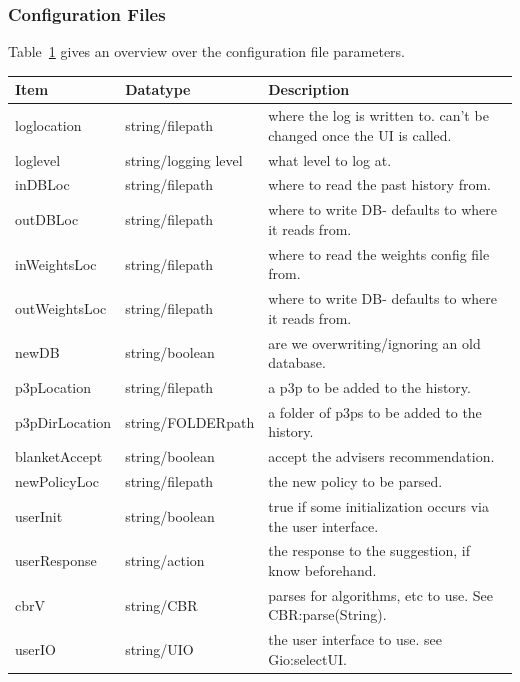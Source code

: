 \subsubsection{Configuration Files}

Table~\ref{configTable} gives an overview over the configuration file parameters.

\begin{center}
  \begin{table}[h!]
    \label{configTable}
    \begin{tabular} { | l | l | p{7cm} | }
      \hline
      \textbf{Item} & \textbf{Datatype} & \textbf{Description} \\ \hline
      loglocation & string/filepath  & where the log is written to. can't be changed once the UI is  called. \\ \hline
      loglevel & string/logging level	& what level to log at. \\ \hline
      inDBLoc & string/filepath	& where to read the past history from. \\ \hline
      outDBLoc & string/filepath & where to write DB- defaults to where it reads from. \\ \hline
      inWeightsLoc& string/filepath & where to read the weights config file from. \\ \hline
      outWeightsLoc	& string/filepath & where to write DB- defaults to where it reads from. \\ \hline
      newDB & string/boolean & are we overwriting/ignoring an old database. \\ \hline
      p3pLocation & string/filepath & a p3p to be added to the history. \\ \hline
      p3pDirLocation	& string/FOLDERpath& a folder of p3ps to be added to the history. \\ \hline
      blanketAccept & string/boolean & accept the advisers recommendation. \\ \hline
      newPolicyLoc & string/filepath	& the new policy to be parsed. \\ \hline
      userInit & string/boolean	& true if some initialization occurs via the user interface. \\ \hline
      userResponse & string/action	& the response to the suggestion, if know beforehand. \\ \hline
      cbrV & string/CBR & parses for algorithms, etc to use. See CBR:parse(String). \\ \hline
      userIO & string/UIO	& the user interface to use. see Gio:selectUI. \\ \hline

\end{tabular}
\end{table}
\end{center}
